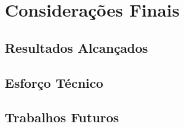 \chapter{Considerações Finais}
\label{cap:plano-de-trabalho}

\section{Resultados Alcançados}
  
\section{Esforço Técnico}

\section{Trabalhos Futuros}








